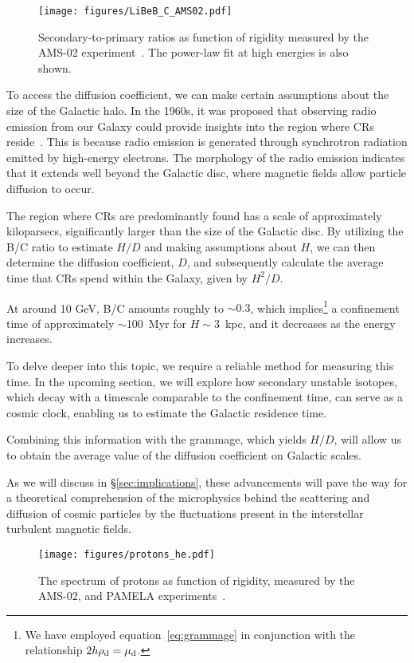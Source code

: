 \begin{figure}
\centering
\texttt{[image: figures/LiBeB\_C\_AMS02.pdf]}
\caption{Secondary-to-primary ratios as function of rigidity measured by the AMS-02 experiment~\cite{AMS02libeb}. The power-law fit at high energies is also shown.}
\label{fig:bcams02}
\end{figure}

To access the diffusion coefficient, we can make certain assumptions about the size of the Galactic halo. 
%
In the 1960s, it was proposed that observing radio emission from our Galaxy could provide insights into the region where CRs reside~\cite{Ginzburg1961ptps}. This is because radio emission is generated through synchrotron radiation emitted by high-energy electrons. The morphology of the radio emission indicates that it extends well beyond the Galactic disc, where magnetic fields allow particle diffusion to occur.

The region where CRs are predominantly found has a scale of approximately kiloparsecs, significantly larger than the size of the Galactic disc. By utilizing the B/C ratio to estimate $H/D$ and making assumptions about $H$, we can then determine the diffusion coefficient, $D$, and subsequently calculate the average time that CRs spend within the Galaxy, given by $H^2/D$. 

At around 10 GeV, B/C amounts roughly to $\sim 0.3$, which implies\footnote{We have employed equation~\eqref{eq:grammage} in conjunction with the relationship $2h \rho_{\rm d} = \mu_{\rm d}$.} a confinement time of approximately $\sim$100~Myr for $H \sim 3$~kpc, and it decreases as the energy increases.

To delve deeper into this topic, we require a reliable method for measuring this time. In the upcoming section, we will explore how secondary unstable isotopes, which decay with a timescale comparable to the confinement time, can serve as a cosmic clock, enabling us to estimate the Galactic residence time.

Combining this information with the grammage, which yields $H/D$, will allow us to obtain the average value of the diffusion coefficient on Galactic scales.

As we will discuss in 
\S\ref{sec:implications}, these advancements will pave the way for a theoretical comprehension of the microphysics behind the scattering and diffusion of cosmic particles by the fluctuations present in the interstellar turbulent magnetic fields.

\begin{figure}
\centering
\texttt{[image: figures/protons\_he.pdf]}
\caption{The spectrum of protons as function of rigidity, measured by the AMS-02, and PAMELA experiments~\cite{AMS02results,PAMELA.2011.proton}.}
\label{fig:protonshe}
\end{figure}

